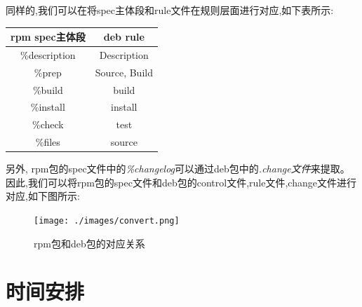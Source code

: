 \documentclass{article}
\begin{document}
同样的,我们可以在将spec主体段和rule文件在规则层面进行对应,如下表所示:
\begin{center}
    \begin{tabular}{|c|c|}
        \hline
        rpm spec主体段 & deb rule \\
        \hline
        \%description & Description \\
        \hline
        \%prep & Source, Build \\
        \hline
        \%build & build \\
        \hline
        \%install & install \\
        \hline
        \%check & test \\
        \hline
        \%files & source \\
        \hline
    \end{tabular}
\end{center}
另外, rpm包的spec文件中的\emph{\%changelog}可以通过deb包中的\emph{.change文件}来提取。
因此,我们可以将rpm包的spec文件和deb包的control文件,rule文件,change文件进行对应,如下图所示:
\begin{figure}[H]
    \centering
    \texttt{[image: ./images/convert.png]}
    \caption{rpm包和deb包的对应关系}
\end{figure}

\section{时间安排}
\end{document}
